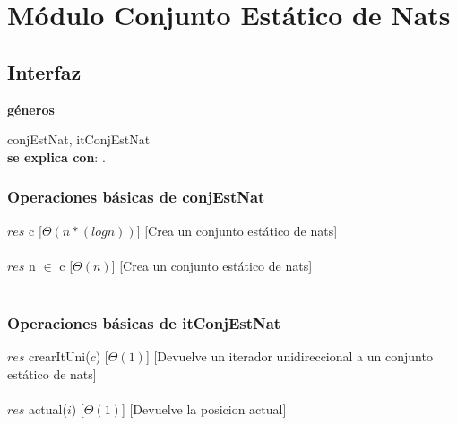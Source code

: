 \section{M\'odulo Conjunto Est\'atico de Nats}
\subsection{Interfaz}

   \parbox{1.7cm}{\textbf{g\'eneros}} conjEstNat, itConjEstNat\\

  \textbf{se explica con}: .


  \subsubsection{Operaciones b\'asicas de conjEstNat}
  {$res$ \igobs c}
  [$\Theta(n*(log n))$]
  [Crea un conjunto est\'atico de nats]\\\\
  
  {$res$ \igobs n $\in$ c}
  [$\Theta(n)$]
  [Crea un conjunto est\'atico de nats]\\\\
  
  \subsubsection{Operaciones b\'asicas de itConjEstNat}  
  
  {$res$ \igobs crearItUni($c$)}
  [$\Theta(1)$]
  [Devuelve un iterador unidireccional a un conjunto est\'atico de nats]\\\\
  
  {$res$ \igobs actual($i$)}
  [$\Theta(1)$]
  [Devuelve la posicion actual]\\\\
  
